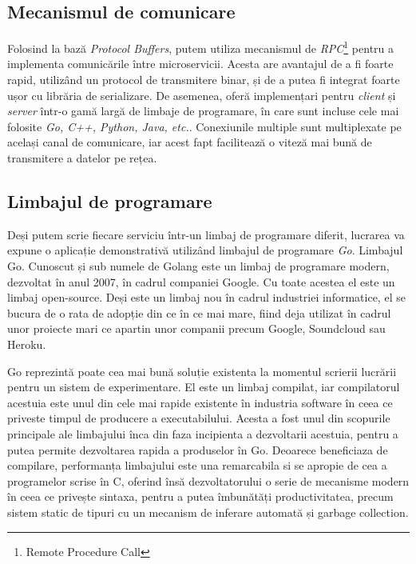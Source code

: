 \subsection{Mecanismul de comunicare}

Folosind la bază \textit{Protocol Buffers}, putem utiliza mecanismul de \textit{RPC}\footnote{Remote Procedure Call} pentru a implementa comunicările între microservicii. Acesta are avantajul de a fi foarte rapid, utilizând un protocol de transmitere binar, și de a putea fi integrat foarte ușor cu librăria de serializare. De asemenea, oferă implemențari pentru \textit{client} și \textit{server} într-o gamă largă de limbaje de programare, în care sunt incluse cele mai folosite \textit{Go, C++, Python, Java, etc.}. Conexiunile multiple sunt multiplexate pe același canal de comunicare, iar acest fapt facilitează o viteză mai bună de transmitere a datelor pe rețea.

\subsection{Limbajul de programare}

Deși putem scrie fiecare serviciu într-un limbaj de programare diferit, lucrarea va expune o aplicație demonstrativă utilizând limbajul de programare \textit{Go}. Limbajul Go. Cunoscut și sub numele de Golang este un limbaj de programare modern, dezvoltat în anul 2007, în cadrul companiei Google. Cu toate acestea el este un limbaj open-source. Deși este un limbaj nou în cadrul industriei informatice, el se bucura de o rata de adopție din ce în ce mai mare, fiind deja utilizat în cadrul unor
proiecte mari ce apartin unor companii precum Google, Soundcloud sau Heroku.

Go reprezintă poate cea mai bună soluție existenta la
momentul scrierii lucrării pentru un sistem de experimentare. El este un limbaj compilat, iar compilatorul acestuia este unul din cele mai rapide existente în industria
software în ceea ce priveste timpul de producere a executabilului. Acesta a fost unul din scopurile principale ale limbajului înca din faza incipienta a dezvoltarii acestuia, pentru a putea permite dezvoltarea rapida a produselor în Go. Deoarece beneficiaza de compilare, performanța limbajului este una remarcabila si se apropie de cea a programelor scrise în C, oferind însă dezvoltatorului o serie de mecanisme modern în ceea ce privește sintaxa, pentru a putea îmbunătăți productivitatea, precum sistem static de tipuri cu un mecanism de inferare automată și garbage collection. 



